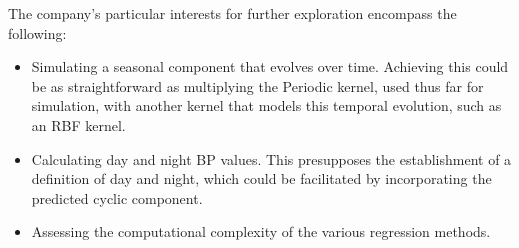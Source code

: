 The company's particular interests for further exploration encompass the following:
\begin{itemize}
    \item Simulating a seasonal component that evolves over time.
    Achieving this could be as straightforward as multiplying the Periodic kernel,
    used thus far for simulation, with another kernel that models this temporal evolution,
    such as an RBF kernel.
    \item Calculating day and night BP values.
    This presupposes the establishment of a definition of day and night,
    which could be facilitated by incorporating the predicted cyclic component.
    \item Assessing the computational complexity of the various regression methods.
\end{itemize}






%
%
%
%

